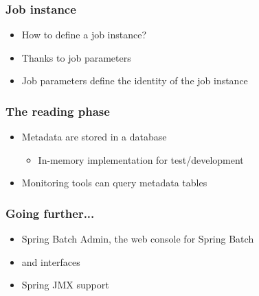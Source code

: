 \begin{frame}
\frametitle{Job instance}
\begin{itemize}
 \item How to define a job instance?
 \item Thanks to job parameters
 \item Job parameters define the identity of the job instance
\end{itemize}
\end{frame}

\begin{frame}
\frametitle{The reading phase}
\begin{itemize}
 \item Metadata are stored in a database 
 \begin{itemize}
  \item In-memory implementation for test/development
 \end{itemize}
 \item Monitoring tools can query metadata tables
\end{itemize}
\end{frame}

\begin{frame}
 \frametitle{Going further...}
 \begin{itemize}
  \item Spring Batch Admin, the web console for Spring Batch
  \item {} and  interfaces
  \item Spring JMX support
 \end{itemize}
\end{frame}

